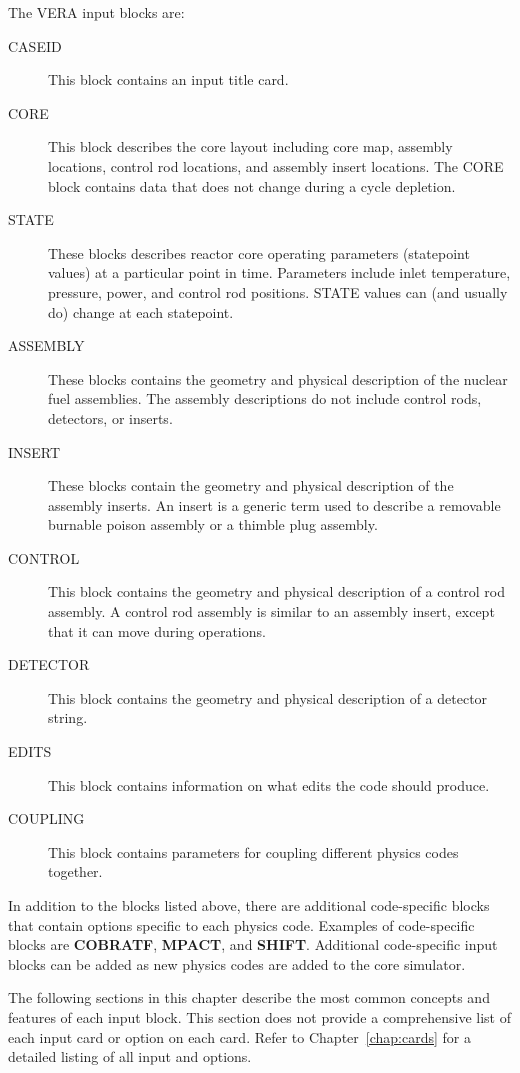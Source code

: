 \documentclass{report}
\numberwithin{equation}{section}
\begin{document}
The VERA input blocks are:
\begin{description}
\item[CASEID] This block contains an input title card.
\item[CORE] This block describes the core layout including core map, assembly locations,
  control rod locations, and assembly insert locations.  The CORE block contains data that does not change
  during a cycle depletion.
\item[STATE] These blocks describes reactor core operating parameters (statepoint values)
  at a particular point in time.
  Parameters include inlet temperature, pressure, power, and control rod positions.  
  STATE values can (and usually do) change at each statepoint.
\item[ASSEMBLY] These blocks contains the geometry and physical description of the nuclear fuel assemblies.
  The assembly descriptions do not include control rods, detectors, or inserts.
\item[INSERT] These blocks contain the geometry and physical description of the assembly inserts. 
   An insert is a generic term used to describe a removable burnable poison assembly or a thimble plug assembly.
\item[CONTROL] This block contains the geometry and physical description of a control rod assembly.
   A control rod assembly is similar to an assembly insert, except that it can move
   during operations.
\item[DETECTOR] This block contains the geometry and physical description of a detector string.
\item[EDITS] This block contains information on what edits the code should produce.
\item[COUPLING] This block contains parameters for coupling different physics codes together.
\end{description}

In addition to the blocks listed above, there are additional code-specific blocks that contain
options specific to each physics code.
Examples of code-specific blocks are {\bf COBRATF}, {\bf MPACT}, and {\bf SHIFT}.
Additional code-specific input blocks can be added as new physics codes are added to the core simulator.

The following sections in this chapter describe the most common concepts and features of each input block.
This section does not provide a comprehensive list of each input card or option on each card.  
Refer to Chapter~\ref{chap:cards} for a detailed listing of all input and options.
\end{document}
